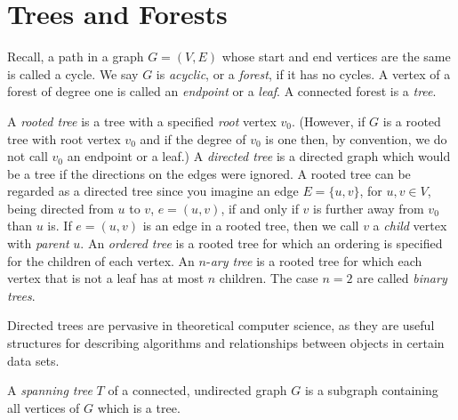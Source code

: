 
\chapter{Trees and Forests}
\label{chap:trees_forests}

Recall, a path in a graph $G = (V, E)$ whose start and end vertices
are the same is called a cycle. We say $G$ is \emph{acyclic}, or a
\emph{forest}, if it has no cycles. A vertex of a forest of degree one
is called an \emph{endpoint} or a \emph{leaf}.
A connected forest is a \emph{tree}.

A \emph{rooted tree} is a tree with a specified \emph{root} vertex
$v_0$. (However, if $G$ is a rooted tree with root vertex $v_0$ and if
the degree of $v_0$ is one then, by convention, we do not call $v_0$
an endpoint or a leaf.)
A \emph{directed tree} is a directed graph which would be a tree if
the directions on the edges were ignored.
A rooted tree can be regarded as a directed tree since you imagine an
edge $E = \{u, v\}$, for $u, v \in V$, being directed from $u$ to $v$,
$e = (u, v)$, if and only if $v$ is further away from $v_0$ than $u$
is. If $e = (u, v)$ is an edge in a rooted tree, then we call $v$ a
\emph{child} vertex with \emph{parent} $u$. An \emph{ordered tree} is
a rooted tree for which an ordering is specified for the children of
each vertex.
An $n$-\emph{ary tree} is a rooted tree for which each vertex that is
not a leaf has at most $n$ children. The case $n = 2$ are called
\emph{binary trees}.

Directed trees are pervasive in theoretical computer science, as they
are useful structures for describing algorithms and relationships
between objects in certain data sets.

A \emph{spanning tree} $T$ of a connected, undirected graph $G$ is a
subgraph containing all vertices of $G$ which is a tree.

